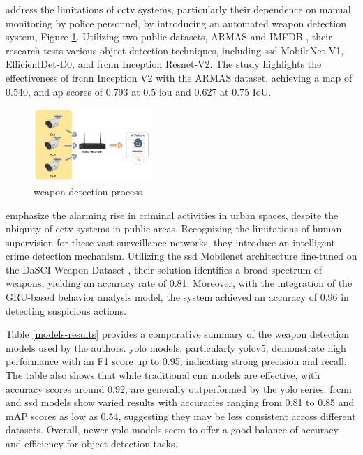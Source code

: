 \citet{rfc20} address the limitations of \ac{cctv} systems, particularly their dependence on manual monitoring by police personnel, by introducing an automated weapon detection system, Figure \ref{fig:hnoohom-system}. Utilizing two public datasets, ARMAS and IMFDB \cite{rfc28}, their research tests various object detection techniques, including \ac{ssd} MobileNet-V1, EfficientDet-D0, and \ac{frcnn} Inception Resnet-V2. The study highlights the effectiveness of \ac{frcnn} Inception V2 with the ARMAS dataset, achieving a \ac{map} of 0.540, and \ac{ap} scores of 0.793 at 0.5 \ac{iou} and 0.627 at 0.75 IoU.
\begin{figure}[h]
    \centering 
    \includegraphics[width=0.4\textwidth]{figs/hnoohom-system.png} 
    \caption{\citet{rfc20} weapon detection process}
    \label{fig:hnoohom-system}
\end{figure}

\citet{rfc7} emphasize the alarming rise in criminal activities in urban spaces, despite the ubiquity of \ac{cctv} systems in public areas. Recognizing the limitations of human supervision for these vast surveillance networks, they introduce an intelligent crime detection mechanism. Utilizing the \ac{ssd} Mobilenet architecture fine-tuned on the DaSCI Weapon Dataset \cite{rfc29}, their solution identifies a broad spectrum of weapons, yielding an accuracy rate of 0.81. Moreover, with the integration of the GRU-based behavior analysis model, the system achieved an accuracy of 0.96 in detecting suspicious actions.

Table \ref{models-results} provides a comparative summary of the weapon detection models used by the authors. \ac{yolo} models, particularly \ac{yolo}v5, demonstrate high performance with an F1 score up to 0.95, indicating strong precision and recall. The table also shows that while traditional \ac{cnn} models are effective, with accuracy scores around 0.92, are generally outperformed by the \ac{yolo} series. \ac{frcnn} and \ac{ssd} models show varied results with accuracies ranging from 0.81 to 0.85 and mAP scores as low as 0.54, suggesting they may be less consistent across different datasets. Overall, newer \ac{yolo} models seem to offer a good balance of accuracy and efficiency for object detection tasks.

